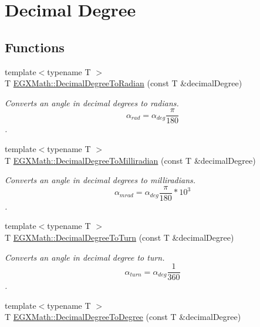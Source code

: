 \hypertarget{group___e_g_x_math-_angle_conversions-_decimal_degree}{}\section{Decimal Degree}
\label{group___e_g_x_math-_angle_conversions-_decimal_degree}
\subsection*{Functions}
\begin{DoxyCompactItemize}
\item 
{\footnotesize template$<$typename T $>$ }\\T \mbox{\hyperlink{group___e_g_x_math-_angle_conversions-_decimal_degree_ga906ee2c83cdf4caa59eb613dc2d5d52a}{E\+G\+X\+Math\+::\+Decimal\+Degree\+To\+Radian}} (const T \&decimal\+Degree)
\begin{DoxyCompactList}\small\item\em Converts an angle in decimal degrees to radians. \[\alpha_{rad}=\alpha_{deg}\frac{\pi}{180}\]. \end{DoxyCompactList}\item 
{\footnotesize template$<$typename T $>$ }\\T \mbox{\hyperlink{group___e_g_x_math-_angle_conversions-_decimal_degree_gab567d02d4692d9642a4ad219e479713a}{E\+G\+X\+Math\+::\+Decimal\+Degree\+To\+Milliradian}} (const T \&decimal\+Degree)
\begin{DoxyCompactList}\small\item\em Converts an angle in decimal degrees to milliradians. \[\alpha_{mrad}=\alpha_{deg}\frac{\pi}{180}*10^3\]. \end{DoxyCompactList}\item 
{\footnotesize template$<$typename T $>$ }\\T \mbox{\hyperlink{group___e_g_x_math-_angle_conversions-_decimal_degree_ga396a13c10acdef5026c12f3217b142c1}{E\+G\+X\+Math\+::\+Decimal\+Degree\+To\+Turn}} (const T \&decimal\+Degree)
\begin{DoxyCompactList}\small\item\em Converts an angle in decimal degree to turn. \[\alpha_{turn}=\alpha_{deg}\frac{1}{360}\]. \end{DoxyCompactList}\item 
{\footnotesize template$<$typename T $>$ }\\T \mbox{\hyperlink{group___e_g_x_math-_angle_conversions-_decimal_degree_ga0aa7f2f5dbb00cf4ab303421c6e33ccf}{E\+G\+X\+Math\+::\+Decimal\+Degree\+To\+Degree}} (const T \&decimal\+Degree)

\end{DoxyCompactItemize}

